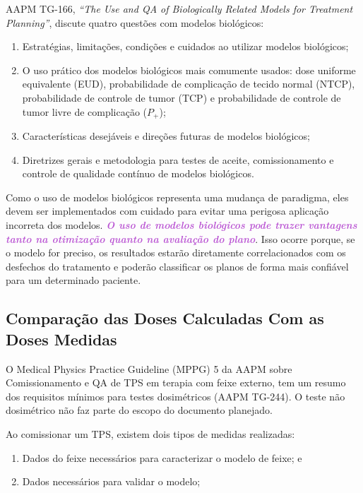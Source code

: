\documentclass[11pt,a4paper]{article}
\begin{document}
	AAPM TG-166, \textit{``The Use and QA of Biologically Related Models for Treatment Planning''}, discute quatro questões com modelos biológicos:

	\begin{enumerate}
		\item Estratégias, limitações, condições e cuidados ao utilizar modelos biológicos;
		\item O uso prático dos modelos biológicos mais comumente usados: dose uniforme equivalente (EUD), probabilidade de complicação de tecido normal (NTCP), probabilidade de controle de tumor (TCP) e probabilidade de controle de tumor livre de complicação ($P_+$);
		\item Características desejáveis e direções futuras de modelos biológicos;
		\item Diretrizes gerais e metodologia para testes de aceite, comissionamento e controle de qualidade contínuo de modelos biológicos.
	\end{enumerate}

	Como o uso de modelos biológicos representa uma mudança de paradigma, eles devem ser implementados com cuidado para evitar uma perigosa aplicação incorreta dos modelos. \textcolor{MediumOrchid}{\textbf{\textit{O uso de modelos biológicos pode trazer vantagens tanto na otimização quanto na avaliação do plano}}}. Isso ocorre porque, se o modelo for preciso, os resultados estarão diretamente correlacionados com os desfechos do tratamento e poderão classificar os planos de forma mais confiável para um determinado paciente.

\subsection*{Comparação das Doses Calculadas Com as Doses Medidas}

	O Medical Physics Practice Guideline (MPPG) 5 da AAPM sobre Comissionamento e QA de TPS em terapia com feixe externo, tem um resumo dos requisitos mínimos para testes dosimétricos (AAPM TG-244). O teste não dosimétrico não faz parte do escopo do documento planejado.

	Ao comissionar um TPS, existem dois tipos de medidas realizadas:

	\begin{enumerate}[label=\textcolor{CarnationPink}{\roman*.}]
		\item Dados do feixe necessários para caracterizar o modelo de feixe; e
		\item Dados necessários para validar o modelo;
	\end{enumerate}
\end{document}
